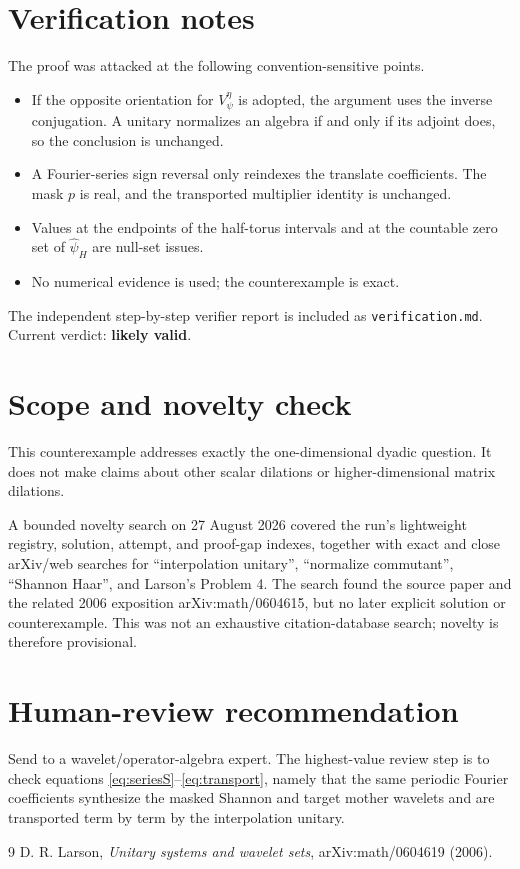 \documentclass[11pt]{article}
\begin{document}
\section{Verification notes}

The proof was attacked at the following convention-sensitive points.
\begin{itemize}
\item If the opposite orientation for $V_\psi^\eta$ is adopted, the argument
uses the inverse conjugation.  A unitary normalizes an algebra if and only if
its adjoint does, so the conclusion is unchanged.
\item A Fourier-series sign reversal only reindexes the translate coefficients.
The mask $p$ is real, and the transported multiplier identity is unchanged.
\item Values at the endpoints of the half-torus intervals and at the countable
zero set of $\widehat\psi_H$ are null-set issues.
\item No numerical evidence is used; the counterexample is exact.
\end{itemize}
The independent step-by-step verifier report is included as
\texttt{verification.md}.  Current verdict: \textbf{likely valid}.

\section{Scope and novelty check}

This counterexample addresses exactly the one-dimensional dyadic question.  It
does not make claims about other scalar dilations or higher-dimensional matrix
dilations.

A bounded novelty search on 27 August 2026 covered the run's lightweight
registry, solution, attempt, and proof-gap indexes, together with
exact and close arXiv/web searches for ``interpolation unitary'', ``normalize
commutant'', ``Shannon Haar'', and Larson's Problem 4.  The search found the
source paper and the related 2006 exposition arXiv:math/0604615, but no later
explicit solution or counterexample.  This was not an exhaustive
citation-database search; novelty is therefore provisional.

\section{Human-review recommendation}

Send to a wavelet/operator-algebra expert.  The highest-value review step is to
check equations \eqref{eq:seriesS}--\eqref{eq:transport}, namely that the same
periodic Fourier coefficients synthesize the masked Shannon and target mother
wavelets and are transported term by term by the interpolation unitary.

\begin{thebibliography}{9}
D. R. Larson,
\emph{Unitary systems and wavelet sets},
arXiv:math/0604619 (2006).
\end{thebibliography}
\end{document}
